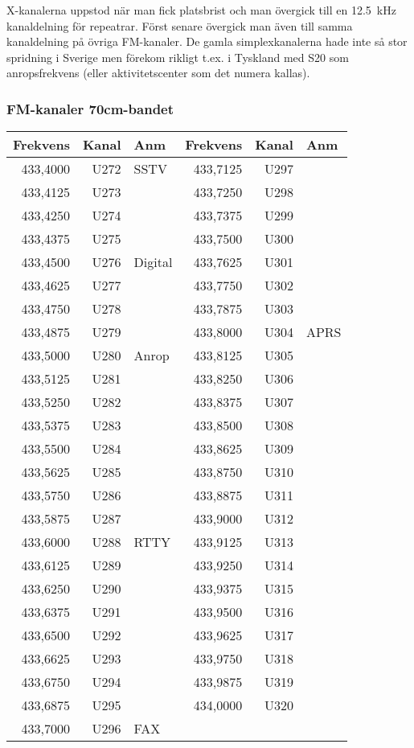 X-kanalerna uppstod när man fick platsbrist och man övergick till en 12.5~kHz kanaldelning för repeatrar. Först senare övergick man även till samma kanaldelning på övriga FM-kanaler. De gamla simplexkanalerna hade inte så stor spridning i Sverige men förekom rikligt t.ex. i Tyskland med S20 som anropsfrekvens (eller aktivitetscenter som det numera kallas).

\clearpage
\subsubsection{FM-kanaler 70cm-bandet}

\begin{longtable}{rrl|rrl}
\textbf{Frekvens} & \textbf{Kanal} & \textbf{Anm} &  
\textbf{Frekvens} & \textbf{Kanal} & \textbf{Anm} \\ \hline

433,4000 & U272 & SSTV    & 433,7125 & U297 &      \\
433,4125 & U273 &         & 433,7250 & U298 &      \\
433,4250 & U274 &         & 433,7375 & U299 &      \\
433,4375 & U275 &         & 433,7500 & U300 &      \\
433,4500 & U276 & Digital & 433,7625 & U301 &      \\
433,4625 & U277 &         & 433,7750 & U302 &      \\
433,4750 & U278 &         & 433,7875 & U303 &      \\
433,4875 & U279 &         & 433,8000 & U304 & APRS \\
433,5000 & U280 & Anrop   & 433,8125 & U305 &      \\
433,5125 & U281 &         & 433,8250 & U306 &      \\
433,5250 & U282 &         & 433,8375 & U307 &      \\
433,5375 & U283 &         & 433,8500 & U308 &      \\
433,5500 & U284 &         & 433,8625 & U309 &      \\
433,5625 & U285 &         & 433,8750 & U310 &      \\
433,5750 & U286 &         & 433,8875 & U311 &      \\
433,5875 & U287 &         & 433,9000 & U312 &      \\
433,6000 & U288 & RTTY    & 433,9125 & U313 &      \\
433,6125 & U289 &         & 433,9250 & U314 &      \\
433,6250 & U290 &         & 433,9375 & U315 &      \\
433,6375 & U291 &         & 433,9500 & U316 &      \\
433,6500 & U292 &         & 433,9625 & U317 &      \\
433,6625 & U293 &         & 433,9750 & U318 &      \\
433,6750 & U294 &         & 433,9875 & U319 &      \\
433,6875 & U295 &         & 434,0000 & U320 &      \\
433,7000 & U296 & FAX     &          &      &      \\

\end{longtable}
